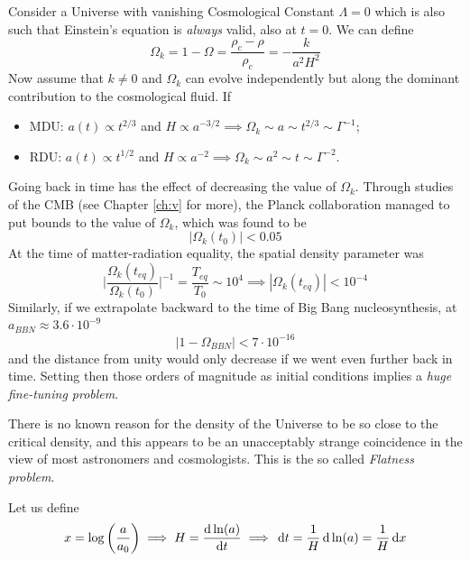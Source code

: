 Consider a Universe with vanishing Cosmological Constant $\Lambda = 0$ which is also such that Einstein's equation is \emph{always} valid, also at $t=0$. We can define
\begin{equation}
    \Omega_{k} = 1-\Omega = \frac{\rho_{c}-\rho}{\rho_{c}} = -\frac{k}{a^{2}H^{2}}
\end{equation}
Now assume that $k\neq 0$ and $\Omega_{k}$ can evolve independently but along the dominant contribution to the cosmological fluid. If
\begin{itemize}
    \item MDU: $a(t)\propto t^{2/3}$ and $H \propto a^{-3/2} \implies \Omega_{k}\sim a \sim t^{2/3}\sim \Gamma^{-1}$;
    \item RDU: $a(t)\propto t^{1/2}$ and $H \propto a^{-2} \implies \Omega_{k}\sim a^{2} \sim t \sim \Gamma^{-2}$.
\end{itemize}
Going back in time has the effect of decreasing the value of $\Omega_{k}$. Through studies of the CMB (see Chapter \ref{ch:v} for more), the Planck collaboration managed to put bounds to the value of $\Omega_{k}$, which was found to be
\begin{equation}
    |\Omega_{k}(t_{0})| < 0.05
\end{equation}
At the time of matter-radiation equality, the spatial density parameter was 
\begin{equation}
    \Big| \frac{\Omega_{k}(t_{eq})}{\Omega_{k}(t_{0})}\Big|^{-1} = \frac{T_{eq}}{T_{0}} \sim 10^{4} \implies |\Omega_{k}(t_{eq})| < 10^{-4}
\end{equation}
Similarly, if we extrapolate backward to the time of Big Bang nucleosynthesis, at $a_{BBN} \approx 3.6\cdot 10^{-9}$
\begin{equation*}
    |1-\Omega_{BBN}|<7\cdot10^{-16}
\end{equation*}
and the distance from unity would only decrease if we went even further back in time. Setting then those orders of magnitude as initial conditions implies a \emph{huge fine-tuning problem}.
\par There is no known reason for the density of the Universe to be so close to the critical density, and this appears to be an unacceptably strange coincidence in the view of most astronomers and cosmologists. This is the so called \emph{Flatness problem}.
\par Let us define 
\begin{equation}
    x = \log\left(\frac{a}{a_{0}}\right) \implies H = \frac{\text{d}\ln(a)}{\text{d}t} \implies \,\text{d}t = \frac{1}{H}\,\text{d}\ln(a) = \frac{1}{H}\,\text{d}x
\end{equation}
